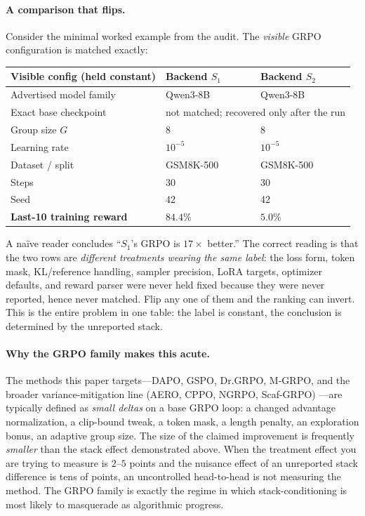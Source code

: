 \documentclass[11pt]{article}
\begin{document}
\paragraph{A comparison that flips.}
Consider the minimal worked example from the audit. The \emph{visible} GRPO
configuration is matched exactly:
\begin{center}
\small
\begin{tabular}{@{}lll@{}}
\toprule
\textbf{Visible config (held constant)} & \textbf{Backend $S_1$} & \textbf{Backend $S_2$}\\
\midrule
Advertised model family & Qwen3-8B & Qwen3-8B \\
Exact base checkpoint & \multicolumn{2}{c}{not matched; recovered only after the run} \\
Group size $G$ & 8 & 8 \\
Learning rate & $10^{-5}$ & $10^{-5}$ \\
Dataset / split & GSM8K-500 & GSM8K-500 \\
Steps & 30 & 30 \\
Seed & 42 & 42 \\
\midrule
\textbf{Last-10 training reward} & $\mathbf{84.4\%}$ & $\mathbf{5.0\%}$ \\
\bottomrule
\end{tabular}
\end{center}
A na\"ive reader concludes ``$S_1$'s GRPO is $17\times$ better.'' The correct
reading is that the two rows are \emph{different treatments wearing the same
label}: the loss form, token mask, KL/reference handling, sampler precision,
LoRA targets, optimizer defaults, and reward parser were never held fixed
because they were never reported, hence never matched. Flip any one of them and
the ranking can invert. This is the entire problem in one table: the label is
constant, the conclusion is determined by the unreported stack.

\paragraph{Why the GRPO family makes this acute.}
The methods this paper targets---DAPO, GSPO, Dr.GRPO, M-GRPO, and the broader
variance-mitigation line (AERO, CPPO, NGRPO, Scaf-GRPO)
\cite{yu2025dapo,qwen2025gspo,tong2025drgrpo,hong2025mgrpo,zhang2026aero,
lin2025cppo,nan2025ngrpo,zhang2025scaffgrpo}---are typically defined as
\emph{small deltas} on a
base GRPO loop: a changed advantage normalization, a clip-bound tweak, a token
mask, a length penalty, an exploration bonus, an adaptive group size. The size
of the claimed improvement is frequently \emph{smaller} than the stack effect
demonstrated above. When the treatment effect you are trying to measure is
$2$--$5$ points and the nuisance effect of an unreported stack difference is
tens of points, an uncontrolled head-to-head is not measuring the method. The
GRPO family is exactly the regime in which stack-conditioning is most likely to
masquerade as algorithmic progress.
\end{document}
